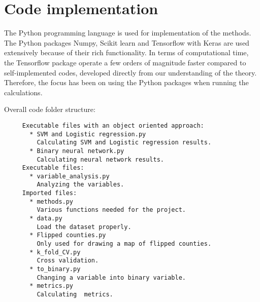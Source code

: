 \section{Code implementation}
The Python programming language is used for implementation of the methods. The Python packages Numpy, Scikit learn and Tensorflow with Keras are used extensively because of their rich functionality. In terms of computational time, the Tensorflow package operate a few orders of magnitude faster compared to self-implemented codes, developed directly from our understanding of the theory. Therefore, the focus has been on using the Python packages when running the calculations.
\\
\par
Overall code folder structure:

\begin{verbatim}
     Executable files with an object oriented approach:
       * SVM and Logistic regression.py
         Calculating SVM and Logistic regression results.
       * Binary neural network.py
         Calculating neural network results.
     Executable files:
       * variable_analysis.py
         Analyzing the variables.
     Imported files:
       * methods.py
         Various functions needed for the project.
       * data.py
         Load the dataset properly.
       * Flipped counties.py
         Only used for drawing a map of flipped counties.
       * k_fold_CV.py
         Cross validation.
       * to_binary.py
         Changing a variable into binary variable.
       * metrics.py
         Calculating  metrics. 
\end{verbatim}